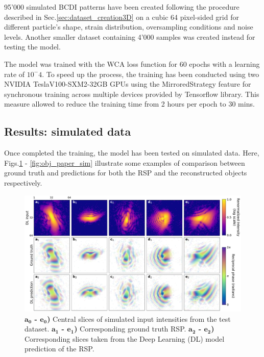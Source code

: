 95'000 simulated BCDI patterns have been created following the procedure described in Sec.\ref{sec:dataset_creation3D} 
on a cubic 64 pixel-sided grid for different particle's shape, strain distribution, oversampling conditions and noise levels. 
Another smaller dataset containing 4'000 samples was created instead for testing the model. 

The model was trained with the WCA loss function for 60 epochs with a learning rate of $10^-4$. To speed up the process, 
the training has been conducted using two NVIDIA TeslaV100-SXM2-32GB GPUs using the MirroredStrategy feature for
synchronous training across multiple devices provided by Tensorflow library. This measure allowed to reduce the training 
time from 2 hours per epoch to 30 mins. 

\subsection{Results: simulated data}\label{chp:phasing_results}

Once completed the training, the model has been tested on simulated data. Here, Figs.\ref{fig:RSP_paper_sim} - \ref{fig:obj_paper_sim}
illustrate some examples of comparison between ground truth and predictions for both the RSP and the reconstructed objects 
respectively. 

\begin{figure}[H]
    \centering
    \includegraphics[width=\textwidth]{figures/Phasing/RSP_3Dsim.pdf}
    \caption{\textbf{\(\boldsymbol{a_0}\) - \(\boldsymbol{e_0}\))} Central slices of simulated input intensities from 
     the test dataset. \textbf{\(\boldsymbol{a_1}\) - \(\boldsymbol{e_1}\))} Corresponding ground truth RSP. 
     \textbf{\(\boldsymbol{a_2}\) - \(\boldsymbol{e_2}\))} Corresponding slices taken from the Deep Learning (DL)
     model prediction of the RSP.}
    \label{fig:RSP_paper_sim}
\end{figure}


